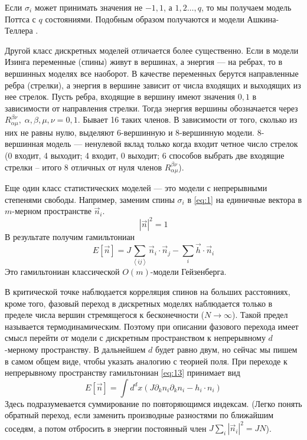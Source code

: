 \documentclass[a4paper,12pt]{article} \usepackage[utf8x]{inputenc} \usepackage[russian]{babel}
\theoremstyle{definition} \newtheorem{corollary}{Corollary}[theorem] \theoremstyle{definition}
\begin{document}
Если $\sigma_i$ может принимать значения не $-1,1$, а $1,2\dots,q$, то мы получаем модель Поттса с
$q$ состояниями. Подобным образом получаются и модели Ашкина-Теллера \cite{difrancesco1997cft}.

Другой класс дискретных моделей отличается более существенно. Если в модели Изинга переменные
(спины) живут в вершинах, а энергия --- на ребрах, то в вершинных моделях все наоборот. В качестве
переменных берутся направленные ребра (стрелки), а энергия в вершине зависит от числа входящих и
выходящих из нее стрелок. Пусть ребра, входящие в вершину имеют значения $0,1$ в зависимости от
направления стрелки. Тогда энергия вершины обозначается через $R_{\alpha\mu}^{\beta\nu},\;
\alpha,\beta,\mu,\nu=0,1$. Бывает 16 таких членов. В зависимости от того, сколько из них не равны
нулю, выделяют 6-вершинную и 8-вершинную модели. 8-вершинная модель --- ненулевой вклад только когда
входит четное число стрелок (0 входит, 4 выходит; 4 входит, 0 выходит; 6 способов выбрать две
входящие стрелки -- итого 8 отличных от нуля членов $R_{\alpha\mu}^{\beta\nu}$).

Еще один класс статистических моделей --- это модели с непрерывными степенями свободы. Например,
заменим спины $\sigma_i$ в \eqref{eq:1} на единичные вектора в $m$-мерном пространстве $\vec n_i$.
\begin{equation}
  \label{eq:14} \left|\vec n\right|^2=1
\end{equation} В результате получим гамильтониан
\begin{equation}
  \label{eq:13} E[\vec n]=J\sum_{\left<ij\right>}\vec n_i\cdot \vec n_j-\sum_i \vec h\cdot \vec n_i
\end{equation} Это гамильтониан классической $O(m)$-модели Гейзенберга.

В критической точке наблюдается корреляция спинов на больших расстояниях, кроме того, фазовый
переход в дискретных моделях наблюдается только в пределе числа вершин стремящегося к бесконечности
($N\to \infty$). Такой предел называется термодинамическим. Поэтому при описании фазового перехода
имеет смысл перейти от модели с дискретным пространством к непрерывному $d$-мерному пространству. В
дальнейшем $d$ будет равно двум, но сейчас мы пишем в самом общем виде, чтобы указать аналогию с
теорией поля. При переходе к непрерывному пространству гамильтониан \eqref{eq:13} принимает вид
\begin{equation}
  \label{eq:15} E[\vec n]=\int d^d x \left(J\partial_kn_i\partial_k n_i-h_i\cdot n_i\right)
\end{equation} Здесь подразумевается суммирование по повторяющимся индексам. (Легко понять обратный
переход, если заменить производные разностями по ближайшим соседям, а потом отбросить в энергии
постоянный член $J\sum_i \left|\vec n_i\right|^2=JN$).
\end{document}
